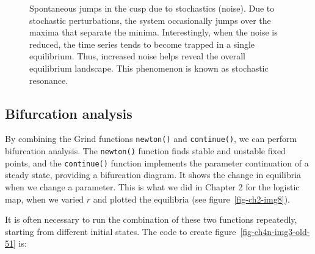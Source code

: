 \documentclass[
  a4paper,
  DIV=11,
  numbers=noendperiod,
  oneside]{scrreprt}
\begin{document}
\begin{figure}


\caption{\label{fig-ch4n-img2-old-50}Spontaneous jumps in the cusp due
to stochastics (noise). Due to stochastic perturbations, the system
occasionally jumps over the maxima that separate the minima.
Interestingly, when the noise is reduced, the time series tends to
become trapped in a single equilibrium. Thus, increased noise helps
reveal the overall equilibrium landscape. This phenomenon is known as
stochastic resonance.}

\end{figure}%

\subsection{Bifurcation analysis}\label{sec-Bifurcation-analysis}

By combining the Grind functions \texttt{newton()} and
\texttt{continue()}, we can perform bifurcation analysis. The
\texttt{newton()} function finds stable and unstable fixed points, and
the \texttt{continue()} function implements the parameter continuation
of a steady state, providing a bifurcation diagram. It shows the change
in equilibria when we change a parameter. This is what we did in Chapter
2 for the logistic map, when we varied \(r\) and plotted the equilibria
(see figure~\ref{fig-ch2-img8}).

It is often necessary to run the combination of these two functions
repeatedly, starting from different initial states. The code to create
figure~\ref{fig-ch4n-img3-old-51} is:
\end{document}
